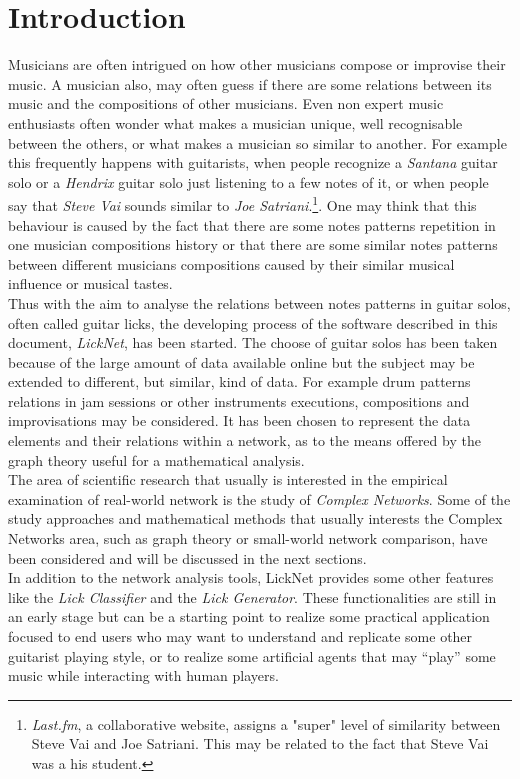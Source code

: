 \documentclass{llncs}
\begin{document}
\section{Introduction}
Musicians are often intrigued on how other musicians compose or
improvise their music. A musician also, may often guess if there are some 
relations between its
music and the compositions of other musicians.
Even non expert music enthusiasts often wonder what makes a 
musician unique, well recognisable between the others, or what makes a
musician so similar to another. For example
this frequently happens with guitarists, when people recognize 
a \emph{Santana} guitar solo or a \emph{Hendrix} guitar solo just listening 
 to a few notes of it, or when people
say that \emph{Steve Vai} sounds similar to \emph{Joe
Satriani}.\footnote{\emph{Last.fm}, a
collaborative website, assigns a "super" level of similarity between Steve Vai
and Joe Satriani. This may be related to the fact that Steve Vai was a
his student.}.
One may think that this behaviour is caused by the fact that there are
some notes patterns
repetition in one musician compositions history or that there are some
similar notes patterns between different musicians compositions caused
by their similar musical influence or musical tastes.\\
Thus with the aim to analyse
the relations between notes patterns in guitar
solos, often called guitar licks, the developing process of the software 
described in this
document, \emph{LickNet}, has been started. The choose of guitar solos has been taken 
because of the large amount of data available online but the subject may 
be extended to
different, but similar, kind of data. For example drum patterns
relations in jam sessions or other instruments executions, compositions
and improvisations may be considered. It has been chosen to represent
the data elements and their relations within a network, as to the
means offered by the graph theory useful for a mathematical analysis.\\
The area of scientific research
that usually is interested in the empirical examination of real-world network
 is the study of \emph{Complex Networks}. Some of the study approaches
and mathematical methods that usually interests the Complex Networks
area, such as graph theory or small-world network
comparison\cite{complex-networks}, 
have been considered and will be discussed in the next sections.\\
In addition to the network analysis tools, LickNet provides some other
features like
the \emph{Lick Classifier} and the \emph{Lick Generator}. These
functionalities are still in an early stage but can be a starting point
to realize some practical application focused to end users who may want to
understand and replicate some other guitarist playing style, or to
realize some artificial agents that may ``play'' some music while interacting
with human players.
\end{document}
